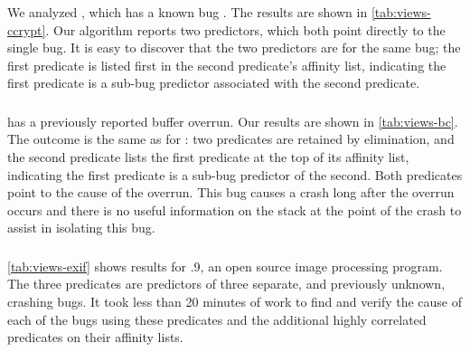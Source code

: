 

\subsubsection{\ccrypt}

We analyzed , which has a known bug \cite{Selinger:2003:cqual}.  
The results are shown in \autoref{tab:views-ccrypt}.
Our algorithm reports two predictors, which both point directly to the single bug. 
It is easy to discover that the two predictors are for the same bug; the first predicate
is listed first in the second predicate's affinity list, indicating the first predicate
is a sub-bug predictor associated with the second predicate.

\subsubsection{\bc}

 has a previously reported buffer overrun.  Our results are shown in \autoref{tab:views-bc}.
The outcome is the same as for \ccrypt: two predicates are retained by elimination, and the second
predicate lists the first predicate at the top of its affinity list, indicating the first predicate
is a sub-bug predictor of the second.  Both predicates point to the cause of the overrun.  
This bug causes a crash long after the overrun occurs and there is no useful
information on the stack at the point of the crash to assist in isolating this bug.

\subsubsection{\exif}

\autoref{tab:views-exif} shows results for .9, an open source image processing program.
The three predicates are predictors of three separate, and previously unknown, crashing bugs.  It took less
than 20 minutes of work to find and verify the cause of each of the bugs using these predicates
and the additional highly correlated predicates on their affinity lists.


